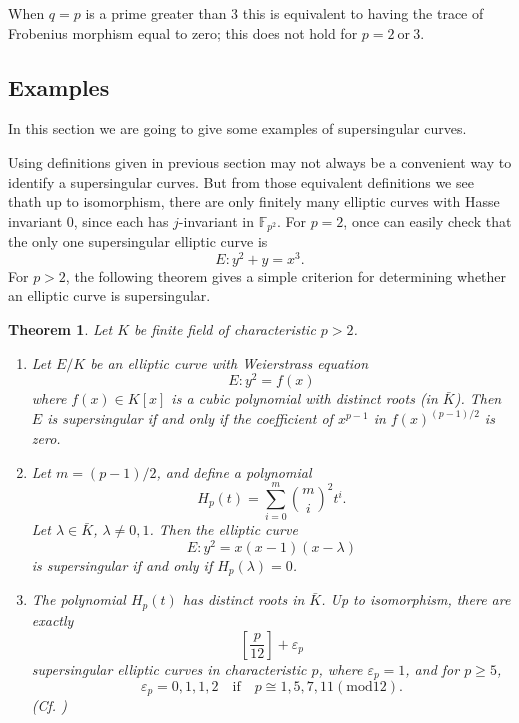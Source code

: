 \documentclass{article}
\theoremstyle{theorem}
\newtheorem{theorem}{Theorem}
\theoremstyle{definition}
\begin{document}
When $q=p$ is a prime greater than 3 this is equivalent to having the trace of Frobenius morphism equal to zero; this does not hold for $p = 2 \ \text{or} \ 3$.

 \subsection{Examples}

In this section we are going to give some examples of supersingular curves.

Using definitions given in previous section may not always be a convenient way to identify a supersingular curves. But from those equivalent definitions we see thath up to isomorphism, there are only finitely many elliptic curves with Hasse invariant 0, since each has $j$-invariant in $\mathbb{F}_{p^2}$. For $p = 2$, once can easily check that the only one supersingular elliptic curve is 
	\[ E: y^2 + y = x^3. \]
For $p > 2$, the following theorem gives a simple criterion for determining whether an elliptic curve is supersingular.

\begin{theorem} \label{thm1}
	Let $K$ be finite field of characteristic $p > 2$.
		\begin{enumerate}[label = (\alph*)]
			\item Let $E/K$ be an elliptic curve with Weierstrass equation 
					\[ E: y^2 = f(x) \]
				where $f(x) \in K[x]$ is a cubic polynomial with distinct roots (in $\bar{K}$). Then $E$ is supersingular if and only if the coefficient of $x^{p - 1}$ in $f(x)^{(p - 1)/2}$ is zero.
			
			\item  Let $m = (p - 1)/2$, and define a polynomial
					\[H_p(t) = \sum_{i = 0}^{m} \binom{m}{i}^2t^i. \]
				Let $\lambda \in \bar{K}$, $\lambda \neq 0, 1$. Then the elliptic curve
					\[E: y^2 = x(x - 1)(x - \lambda)  \]
				is supersingular if and only if $H_p(\lambda) = 0$.
			
			\item The polynomial $H_p(t)$ has distinct roots in $\bar{K}$. Up to isomorphism, there are exactly
					\[ [\frac{p}{12}] + \varepsilon_p \]
				supersingular elliptic curves in characteristic $p$, where $\varepsilon_p = 1$, and for $p \geq 5$,
					\[\varepsilon_p = 0, 1, 1, 2 \quad \textrm{if} \quad p \cong 1, 5, 7, 11 (\mathrm{mod}12). \]
			(Cf. \cite[V, \S4, Theorem 4.1]{Silverman})
		\end{enumerate}
\end{theorem}
\end{document}

